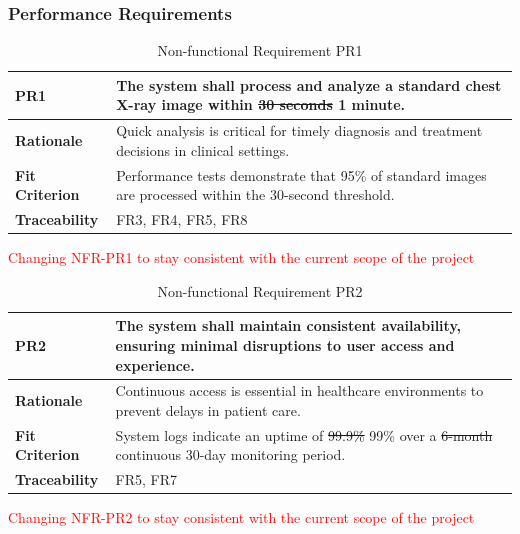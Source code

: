 \documentclass[12pt]{article}
\begin{document}
\subsubsection{Performance Requirements}
\begin{table}[h!]
\centering
{}
\begin{tabular}{|p{3.5cm}|p{11.5cm}|}
\hline
\rowcolor{gray!30}
\textbf{PR1} & The system shall process and analyze a standard chest X-ray image within \sout{30 seconds} 1 minute. \\
\hline
\textbf{Rationale} & Quick analysis is critical for timely diagnosis and treatment decisions in clinical settings. \\
\hline
\textbf{Fit Criterion} & Performance tests demonstrate that 95\% of standard images are processed within the 30-second threshold. \\
\hline
\textbf{Traceability} & FR3, FR4, FR5, FR8 \\
\hline
\end{tabular}
\caption{Non-functional Requirement PR1}
\textcolor{red}{Changing NFR-PR1 to stay consistent with the current scope of the project}
\end{table}

\begin{table}[h!]
\centering
{}
\begin{tabular}{|p{3.5cm}|p{11.5cm}|}
\hline
\rowcolor{gray!30}
\textbf{PR2} & The system shall maintain consistent availability, ensuring minimal disruptions to user access and experience. \\
\hline
\textbf{Rationale} & Continuous access is essential in healthcare environments to prevent delays in patient care. \\
\hline
\textbf{Fit Criterion} & System logs indicate an uptime of \sout{99.9\%} 99\% over a \sout{6-month} continuous 30-day monitoring period. \\
\hline
\textbf{Traceability} & FR5, FR7 \\
\hline
\end{tabular}
\caption{Non-functional Requirement PR2}
\textcolor{red}{Changing NFR-PR2 to stay consistent with the current scope of the project}
\end{table}
\end{document}
